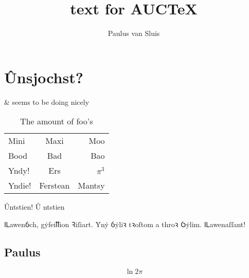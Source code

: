 \documentclass[a4paper]{memoir}
\title{text for AUC\TeX}
\author{Paulus van Sluis}
\begin{document}
\chapter{Ûnsjochst?}
\&   seems to be doing nicely

\begin{table}[h]
  \centering
  \begin{tabular}{lcr}\toprule
    Mini & Maxi & Moo\\
    Bood & Bad & Bao \\\midrule
    Yndy! & Ers & \(\pi^{3}\)\\
    Yndie! & Ferstean & Mantsy \\\bottomrule
  \end{tabular}
  \caption{The amount of foo's}
  \label{tab:foos}
\end{table}
Ûntstien! \^U%
ntstien

\autocite{harvey_aspects_1984}
\autocite{lewis_concise_1974}

Ỻawenỽch, gẏfeiỻion Ꝛiſiart. Ẏnẏ ỽẏliꝛ tꝛoſtom a throꝛ Ỽẏlim. Ỻawenaſſant!

\printbibliography
\section{Paulus}
\label{sec:paulus}
\pageref{sec:paulus}

\[\ln{2}\pi\]


\cite{rodway_datable_1998}
\autocite{parry_owen_concordans_???}


\end{document}
